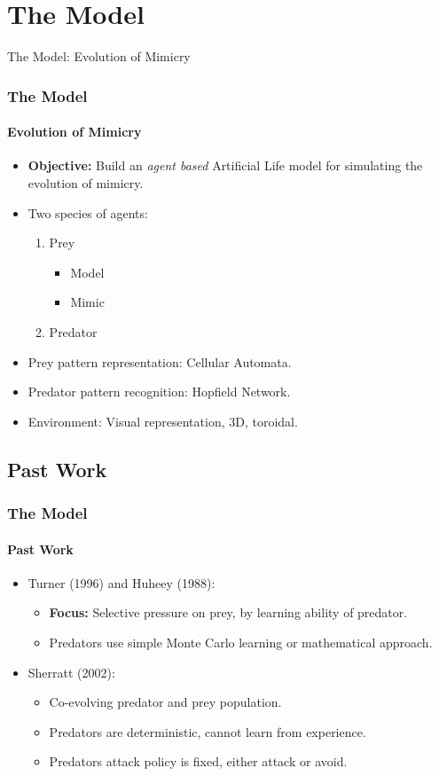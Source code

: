 \section{The Model}

\frame
{
	\begin{center}
		\LARGE The Model: Evolution of Mimicry
	\end{center}
}

\frame
{
	\frametitle{The Model}
	\framesubtitle{Evolution of Mimicry}
	
	\begin{itemize}
		\item \textbf{Objective:} Build an \textit{agent based} Artificial Life model for simulating the evolution of mimicry.	
		\item Two species of agents:
			\begin{enumerate}
				\item Prey
					\begin{itemize}
						\item Model
						\item Mimic
					\end{itemize}
				\item Predator
			\end{enumerate}
		\item Prey pattern representation: Cellular Automata.
		\item Predator pattern recognition: Hopfield Network.
		\item Environment: Visual representation, 3D, toroidal.
	\end{itemize}	
}

\subsection{Past Work}

\frame
{
	\frametitle{The Model}
	\framesubtitle{Past Work}

	\begin{itemize}
		\item Turner (1996) and Huheey (1988):
			\begin{itemize}
				\item \textbf{Focus:} Selective pressure on prey, by learning ability of predator.
				\item Predators use simple Monte Carlo learning or mathematical approach.
			\end{itemize}
		\item Sherratt (2002):
			\begin{itemize}
				\item Co-evolving predator and prey population.
				\item Predators are deterministic, cannot learn from experience.
				\item Predators attack policy is fixed, either attack or avoid.
			\end{itemize}
	\end{itemize}
}

